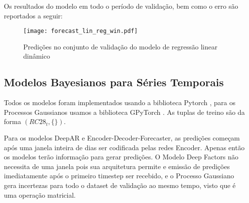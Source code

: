 Os resultados do modelo em todo o período de validação, bem como o erro são
reportados a seguir:

\begin{figure}[H]
  \centering
  \texttt{[image: forecast\_lin\_reg\_win.pdf]}
  \caption{Predições no conjunto de validação do modelo de regressão linear dinâmico}
  \label{fig:tdparam}
\end{figure}

\subsection{Modelos Bayesianos para Séries Temporais}


Todos os modelos foram implementados usando a biblioteca Pytorch \cite{pytorch}, para os Processos Gaussianos usamos a biblioteca GPyTorch \cite{gpytorch}. As tuplas de treino são da forma $(RC28_{t},\{\})$. 

Para os modelos DeepAR e Encoder-Decoder-Forecaster, as predições começam após uma janela inteira de dias ser codificada pelas redes Encoder. Apenas então os modelos terão informação para gerar predições. O Modelo Deep Factors não necessita de uma janela pois sua arquitetura permite e emissão de predições imediatamente após o primeiro timestep ser recebido, e o Processo Gaussiano gera incertezas para todo o dataset de validação ao mesmo tempo, visto que é uma operação matricial. \\





